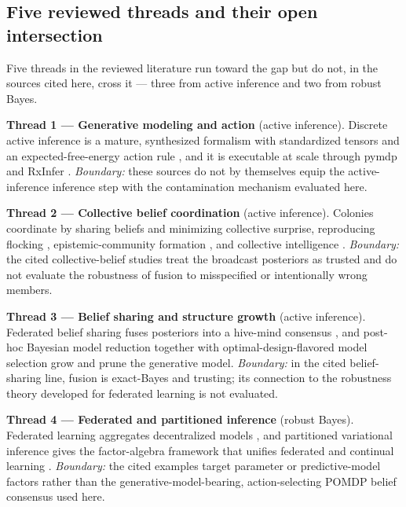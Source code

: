 \documentclass[
  english,
]{article}
\theoremstyle{plain}
\theoremstyle{definition}
\theoremstyle{remark}
\theoremstyle{definition}
\begin{document}
\subsection{Five reviewed threads and their open
intersection}\label{sec:gap-threads}

Five threads in the reviewed literature run toward the gap but do not,
in the sources cited here, cross it --- three from active inference and
two from robust Bayes.

\textbf{Thread 1 --- Generative modeling and action} (active inference).
Discrete active inference is a mature, synthesized formalism with
standardized tensors and an expected-free-energy action rule
\citep{friston2010free, dacosta2020active}, and it is executable at
scale through pymdp \citep{heins2022pymdp} and RxInfer
\citep{bagaev2023rxinfer}. \emph{Boundary:} these sources do not by
themselves equip the active-inference inference step with the
contamination mechanism evaluated here.

\textbf{Thread 2 --- Collective belief coordination} (active inference).
Colonies coordinate by sharing beliefs and minimizing collective
surprise, reproducing flocking \citep{heins2023collective},
epistemic-community formation \citep{albarracin2022epistemic}, and
collective intelligence \citep{kaufmann2021collective}. \emph{Boundary:}
the cited collective-belief studies treat the broadcast posteriors as
trusted and do not evaluate the robustness of fusion to misspecified or
intentionally wrong members.

\textbf{Thread 3 --- Belief sharing and structure growth} (active
inference). Federated belief sharing fuses posteriors into a hive-mind
consensus \citep{friston2024federated}, and post-hoc Bayesian model
reduction \citep{friston2011post} together with optimal-design-flavored
model selection \citep{smith2020active} grow and prune the generative
model. \emph{Boundary:} in the cited belief-sharing line, fusion is
exact-Bayes and trusting; its connection to the robustness theory
developed for federated learning is not evaluated.

\textbf{Thread 4 --- Federated and partitioned inference} (robust
Bayes). Federated learning aggregates decentralized models
\citep{mcmahan2017communication}, and partitioned variational inference
gives the factor-algebra framework that unifies federated and continual
learning \citep{bui2018partitioned, ashman2022partitioned}.
\emph{Boundary:} the cited examples target parameter or predictive-model
factors rather than the generative-model-bearing, action-selecting POMDP
belief consensus used here.
\end{document}
